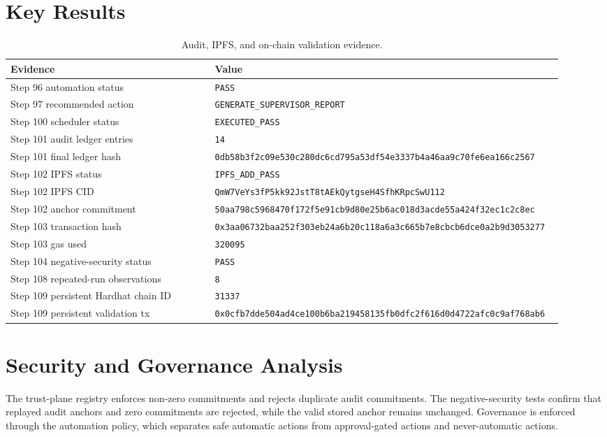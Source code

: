 \documentclass[10pt]{article}
\begin{document}
\section{Key Results}
\begin{longtable}{p{0.36\linewidth} p{0.56\linewidth}}
\caption{Audit, IPFS, and on-chain validation evidence.}\\
\toprule
Evidence & Value \\
\midrule
Step 96 automation status & \texttt{PASS} \\
Step 97 recommended action & \texttt{GENERATE\_SUPERVISOR\_REPORT} \\
Step 100 scheduler status & \texttt{EXECUTED\_PASS} \\
Step 101 audit ledger entries & \texttt{14} \\
Step 101 final ledger hash & \texttt{0db58b3f2c09e530c280dc6cd795a53df54e3337b4a46aa9c70fe6ea166c2567} \\
Step 102 IPFS status & \texttt{IPFS\_ADD\_PASS} \\
Step 102 IPFS CID & \texttt{QmW7VeYs3fP5kk92JstT8tAEkQytgseH4SfhKRpcSwU112} \\
Step 102 anchor commitment & \texttt{50aa798c5968470f172f5e91cb9d80e25b6ac018d3acde55a424f32ec1c2c8ec} \\
Step 103 transaction hash & \texttt{0x3aa06732baa252f303eb24a6b20c118a6a3c665b7e8cbcb6dce0a2b9d3053277} \\
Step 103 gas used & \texttt{320095} \\
Step 104 negative-security status & \texttt{PASS} \\
Step 108 repeated-run observations & \texttt{8} \\
Step 109 persistent Hardhat chain ID & \texttt{31337} \\
Step 109 persistent validation tx & \texttt{0x0cfb7dde504ad4ce100b6ba219458135fb0dfc2f616d0d4722afc0c9af768ab6} \\
\bottomrule
\end{longtable}
\section{Security and Governance Analysis}
The trust-plane registry enforces non-zero commitments and rejects duplicate audit commitments. The negative-security tests confirm that replayed audit anchors and zero commitments are rejected, while the valid stored anchor remains unchanged. Governance is enforced through the automation policy, which separates safe automatic actions from approval-gated actions and never-automatic actions.
\end{document}
